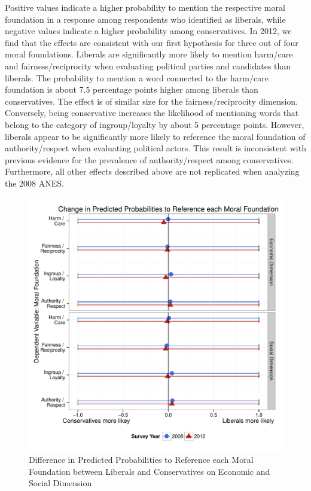 \documentclass[12pt]{article}
\begin{document}
Positive values indicate a higher probability to mention the respective moral foundation in a response among respondents who identified as liberals, while negative values indicate a higher probability among conservatives. In 2012, we find that the effects are consistent with our first hypothesis for three out of four moral foundations. Liberals are significantly more likely to mention harm/care and fairness/reciprocity when evaluating political parties and candidates than liberals. The probability to mention a word connected to the harm/care foundation is about 7.5 percentage points higher among liberals than conservatives. The effect is of similar size for the fairness/reciprocity dimension. Conversely, being conservative increases the likelihood of mentioning words that belong to the category of ingroup/loyalty by about 5 percentage points. However, liberals appear to be significantly more likely to reference the moral foundation of authority/respect when evaluating political actors. This result is inconsistent with previous evidence for the prevalence of authority/respect among conservatives. Furthermore, all other effects described above are not replicated when analyzing the 2008 ANES.

\begin{figure}\centering
\includegraphics[scale=.6]{../calc/fig/m1b_mft.pdf}
\caption{Difference in Predicted Probabilities to Reference each Moral Foundation between Liberals and Conservatives on Economic and Social Dimension}\label{fig:m1b_mft}
\end{figure}
\end{document}
